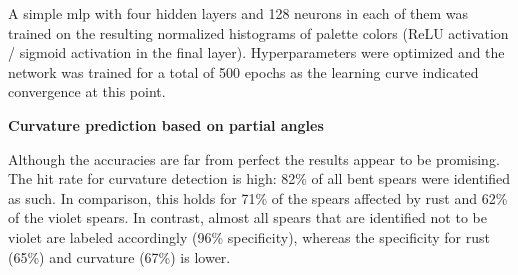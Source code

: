 A simple \acrshort{mlp} with four hidden layers and 128 neurons in each of them was trained on the resulting normalized histograms of palette colors (ReLU activation / sigmoid activation in the final layer). Hyperparameters were optimized and the network was trained for a total of 500 epochs as the learning curve indicated convergence at this point.

\bigskip
\textbf{Curvature prediction based on partial angles} 

Although the accuracies are far from perfect the results appear to be promising. The hit rate for curvature detection is high: 82\% of all bent spears were identified as such. In comparison, this holds for 71\% of the spears affected by rust and 62\% of the violet spears. In contrast, almost all spears that are identified not to be violet are labeled accordingly (96\% specificity), whereas the specificity for rust (65\%) and curvature (67\%) is lower.

\begin{table}[!h]
	\centering
	\caption[Feature Engineering Curvature Prediction]{\textbf{Curvature Prediction}~~~Performance of curvature prediction based on angles}
	\label{tab:performance_angle_based}
\end{table}

